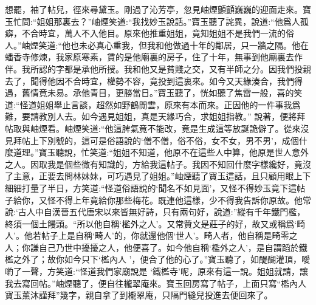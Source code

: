 \begin{parag}
    想罷，袖了帖兒，徑來尋黛玉。剛過了沁芳亭，忽見岫煙顫顫巍巍的迎面走來。寶玉忙問:“姐姐那裏去？”岫煙笑道:“我找妙玉說話。”寶玉聽了詫異，說道:“他爲人孤癖，不合時宜，萬人不入他目。原來他推重姐姐，竟知姐姐不是我們一流的俗人。”岫煙笑道:“他也未必真心重我，但我和他做過十年的鄰居，只一牆之隔。他在蟠香寺修煉，我家原寒素，賃的是他廟裏的房子，住了十年，無事到他廟裏去作伴。我所認的字都是承他所授。我和他又是貧賤之交，又有半師之分。因我們投親去了，聞得他因不合時宜，權勢不容，竟投到這裏來。如今又天緣湊合，我們得遇，舊情竟未易。承他青目，更勝當日。”寶玉聽了，恍如聽了焦雷一般，喜的笑道:“怪道姐姐舉止言談，超然如野鶴閒雲，原來有本而來。正因他的一件事我爲難，要請教別人去。如今遇見姐姐，真是天緣巧合，求姐姐指教。” 說著，便將拜帖取與岫煙看。岫煙笑道:“他這脾氣竟不能改，竟是生成這等放誕詭僻了。從來沒見拜帖上下別號的，這可是俗語說的‘僧不僧，俗不俗，女不女，男不男’，成個什麼道理。”寶玉聽說，忙笑道:“姐姐不知道，他原不在這些人中算，他原是世人意外之人。因取我是個些微有知識的，方給我這帖子。我因不知回什麼字樣纔好，竟沒了主意，正要去問林妹妹，可巧遇見了姐姐。”岫煙聽了寶玉這話，且只顧用眼上下細細打量了半日，方笑道:“怪道俗語說的‘聞名不如見面’，又怪不得妙玉竟下這帖子給你，又怪不得上年竟給你那些梅花。既連他這樣，少不得我告訴你原故。他常說:‘古人中自漢晉五代唐宋以來皆無好詩，只有兩句好，說道:”縱有千年鐵門檻，終須一個土饅頭。“所以他自稱‘檻外之人’。又常贊文是莊子的好，故又或稱爲‘畸人’。他若帖子上是自稱‘畸人’的，你就還他個‘世人’。畸人者，他自稱是畸零之人；你謙自己乃世中擾擾之人，他便喜了。如今他自稱‘檻外之人’，是自謂蹈於鐵檻之外了；故你如今只下‘檻內人 ’，便合了他的心了。”寶玉聽了，如醍醐灌頂，噯喲了一聲，方笑道:“怪道我們家廟說是 ‘鐵檻寺’呢，原來有這一說。姐姐就請，讓我去寫回帖。”岫煙聽了，便自往櫳翠庵來。寶玉回房寫了帖子，上面只寫“檻內人寶玉薰沐謹拜”幾字，親自拿了到櫳翠庵，只隔門縫兒投進去便回來了。
\end{parag}



